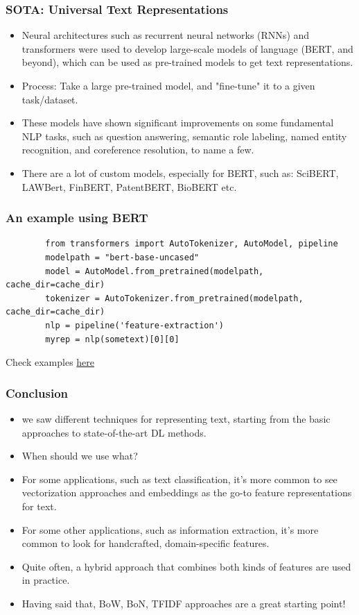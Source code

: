 \documentclass{beamer}
\begin{document}
\begin{frame}
\frametitle{SOTA: Universal Text Representations}
\begin{itemize}
\item Neural architectures such as recurrent neural networks (RNNs) and transformers were used to develop large-scale models of language (BERT, and beyond), which can be used as pre-trained models to get text representations. 
\item Process: Take a large pre-trained model, and "fine-tune" it to a given task/dataset. 
\item These models have shown significant improvements on some fundamental NLP tasks, such as question answering, semantic role labeling, named entity recognition, and coreference resolution, to name a few. 
\item There are a lot of custom models, especially for BERT, such as: SciBERT, LAWBert, FinBERT, PatentBERT, BioBERT etc.
\end{itemize}
\end{frame}

\begin{frame}[fragile]
\frametitle{An example using BERT}
\tiny
    \begin{verbatim}
        from transformers import AutoTokenizer, AutoModel, pipeline
        modelpath = "bert-base-uncased"
        model = AutoModel.from_pretrained(modelpath, cache_dir=cache_dir)
        tokenizer = AutoTokenizer.from_pretrained(modelpath, cache_dir=cache_dir)
        nlp = pipeline('feature-extraction')
        myrep = nlp(sometext)[0][0]
    \end{verbatim}
    Check examples \href{https://colab.research.google.com/github/mrm8488/shared_colab_notebooks/blob/master/Huggingface_pipelines_demo.ipynb}{here}
\end{frame}

\begin{frame}
\frametitle{Conclusion}
\begin{itemize}
\item we saw different techniques for representing text, starting from the basic approaches to state-of-the-art DL methods. 
\item When should we use what? \pause
\item For some applications, such as text classification, it’s more common to see vectorization approaches and embeddings as the go-to feature representations for text. 
\item For some other applications, such as information extraction, it’s more common to look for handcrafted, domain-specific features. 
\item Quite often, a hybrid approach that combines both kinds of features are used in practice.
\item Having said that, BoW, BoN, TFIDF approaches are a great starting point!
\end{itemize}
\end{frame}
\end{document}
